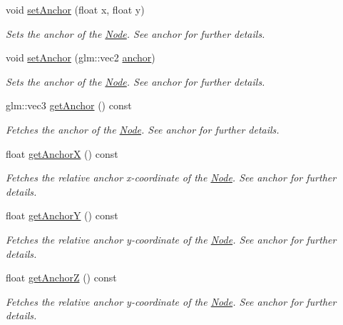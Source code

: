 \begin{DoxyCompactItemize}
void \mbox{\hyperlink{classsage_1_1Node_a8813a645a74f6ab59b25d434e65035c6}{set\+Anchor}} (float x, float y)
\begin{DoxyCompactList}\small\item\em Sets the anchor of the \mbox{\hyperlink{classsage_1_1Node}{Node}}. See anchor for further details. \end{DoxyCompactList}\item 
void \mbox{\hyperlink{classsage_1_1Node_a957a7e578660950b8518926239397ea0}{set\+Anchor}} (glm\+::vec2 \mbox{\hyperlink{classsage_1_1Node_a8698d732514fa2caba0ccee46dbae17a}{anchor}})
\begin{DoxyCompactList}\small\item\em Sets the anchor of the \mbox{\hyperlink{classsage_1_1Node}{Node}}. See anchor for further details. \end{DoxyCompactList}\item 
glm\+::vec3 \mbox{\hyperlink{classsage_1_1Node_a1314e39981d8adee8a75c96f29c9e181}{get\+Anchor}} () const
\begin{DoxyCompactList}\small\item\em Fetches the anchor of the \mbox{\hyperlink{classsage_1_1Node}{Node}}. See anchor for further details. \end{DoxyCompactList}\item 
float \mbox{\hyperlink{classsage_1_1Node_aa5f31c33d60b32b618d3beaf4e5c6c51}{get\+AnchorX}} () const
\begin{DoxyCompactList}\small\item\em Fetches the relative anchor x-\/coordinate of the \mbox{\hyperlink{classsage_1_1Node}{Node}}. See anchor for further details. \end{DoxyCompactList}\item 
float \mbox{\hyperlink{classsage_1_1Node_a78c5f86d0081854603178fb52d8c0a9b}{get\+AnchorY}} () const
\begin{DoxyCompactList}\small\item\em Fetches the relative anchor y-\/coordinate of the \mbox{\hyperlink{classsage_1_1Node}{Node}}. See anchor for further details. \end{DoxyCompactList}\item 
float \mbox{\hyperlink{classsage_1_1Node_a13d0e0b056b8e29091e385f17f8c62f6}{get\+AnchorZ}} () const
\begin{DoxyCompactList}\small\item\em Fetches the relative anchor y-\/coordinate of the \mbox{\hyperlink{classsage_1_1Node}{Node}}. See anchor for further details. \end{DoxyCompactList}\item 

\end{DoxyCompactItemize}
